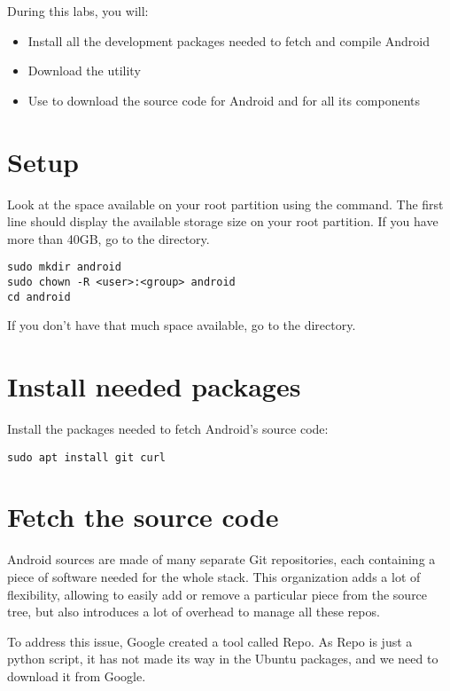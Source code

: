 
During this labs, you will:
\begin{itemize}
  \item Install all the development packages needed to fetch and compile Android
  \item Download the  utility
  \item Use  to download the source code for Android
        and for all its components
\end{itemize}

\section{Setup}

Look at the space available on your root partition using the
 command. The first line should display the available
storage size on your root partition. If you have more than 40GB, go to
the  directory.

\begin{verbatim}
sudo mkdir android
sudo chown -R <user>:<group> android
cd android
\end{verbatim}

If you don't have that much space available, go to the
 directory.

\section{Install needed packages}

Install the packages needed to fetch Android's source code:

\begin{verbatim}
sudo apt install git curl
\end{verbatim}

\section{Fetch the source code}

Android sources are made of many separate Git repositories, each
containing a piece of software needed for the whole stack. This
organization adds a lot of flexibility, allowing to easily add or
remove a particular piece from the source tree, but also introduces a
lot of overhead to manage all these repos.

To address this issue, Google created a tool called Repo. As Repo is
just a python script, it has not made its way in the Ubuntu packages,
and we need to download it from Google.

